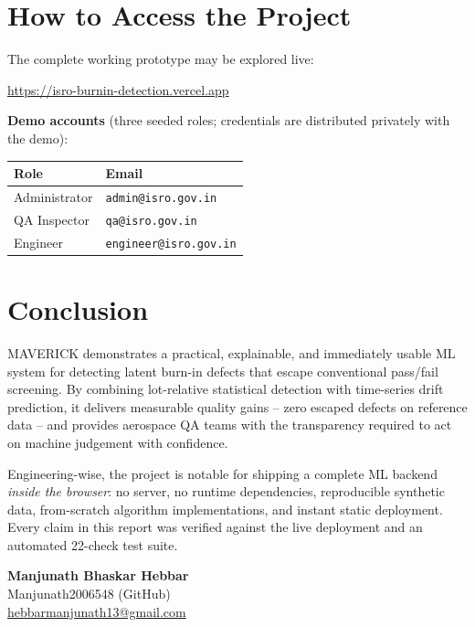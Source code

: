 \documentclass[11pt,a4paper]{article}
\begin{document}
\section{How to Access the Project}
\label{sec:access}

The complete working prototype may be explored live:

\begin{center}
\Large\url{https://isro-burnin-detection.vercel.app}
\end{center}

\textbf{Demo accounts} (three seeded roles; credentials are distributed privately with the demo):
\begin{center}
\begin{tabular}{ll}
  \toprule
  \textbf{Role} & \textbf{Email} \\
  \midrule
  Administrator & \texttt{admin@isro.gov.in}    \\
  QA Inspector  & \texttt{qa@isro.gov.in}       \\
  Engineer      & \texttt{engineer@isro.gov.in} \\
  \bottomrule
\end{tabular}
\end{center}

\section{Conclusion}
\label{sec:conclusion}

MAVERICK demonstrates a practical, explainable, and immediately usable ML system for detecting
latent burn-in defects that escape conventional pass/fail screening. By combining lot-relative
statistical detection with time-series drift prediction, it delivers measurable quality gains
-- zero escaped defects on reference data -- and provides aerospace QA teams with the
transparency required to act on machine judgement with confidence.

Engineering-wise, the project is notable for shipping a complete ML backend \emph{inside the
browser}: no server, no runtime dependencies, reproducible synthetic data, from-scratch
algorithm implementations, and instant static deployment. Every claim in this report was
verified against the live deployment and an automated 22-check test suite.

\vspace{1cm}
\begin{flushright}
\textbf{Manjunath Bhaskar Hebbar}\\
Manjunath2006548 (GitHub) \\
\href{mailto:hebbarmanjunath13@gmail.com}{hebbarmanjunath13@gmail.com}
\end{flushright}
\end{document}
